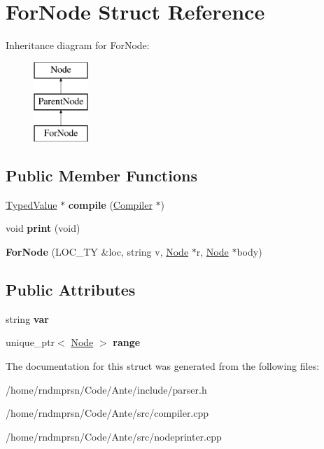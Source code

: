 \hypertarget{structForNode}{}\section{For\+Node Struct Reference}
\label{structForNode}
Inheritance diagram for For\+Node\+:\begin{figure}[H]
\begin{center}
\leavevmode
\includegraphics[height=3.000000cm]{structForNode}
\end{center}
\end{figure}
\subsection*{Public Member Functions}
\begin{DoxyCompactItemize}
\item 
\mbox{\label{structForNode_a778bbee34d0d1a9e8b5f3f642fcfcf5f}} 
\hyperlink{structTypedValue}{Typed\+Value} $\ast$ {\bfseries compile} (\hyperlink{structante_1_1Compiler}{Compiler} $\ast$)
\item 
\mbox{\label{structForNode_ae1e5150b0d39a3417df85851dc2c16ce}} 
void {\bfseries print} (void)
\item 
\mbox{\label{structForNode_ad6a6a63d25aafc81a92f0c6b65142743}} 
{\bfseries For\+Node} (L\+O\+C\+\_\+\+TY \&loc, string v, \hyperlink{structNode}{Node} $\ast$r, \hyperlink{structNode}{Node} $\ast$body)
\end{DoxyCompactItemize}
\subsection*{Public Attributes}
\begin{DoxyCompactItemize}
\item 
\mbox{\label{structForNode_ac2622d6a540f5ebe477f60527aaa170b}} 
string {\bfseries var}
\item 
\mbox{\label{structForNode_ab1a5680a05f1eb115b34b6d37a760821}} 
unique\+\_\+ptr$<$ \hyperlink{structNode}{Node} $>$ {\bfseries range}
\end{DoxyCompactItemize}


The documentation for this struct was generated from the following files\+:\begin{DoxyCompactItemize}
\item 
/home/rndmprsn/\+Code/\+Ante/include/parser.\+h\item 
/home/rndmprsn/\+Code/\+Ante/src/compiler.\+cpp\item 
/home/rndmprsn/\+Code/\+Ante/src/nodeprinter.\+cpp\end{DoxyCompactItemize}
